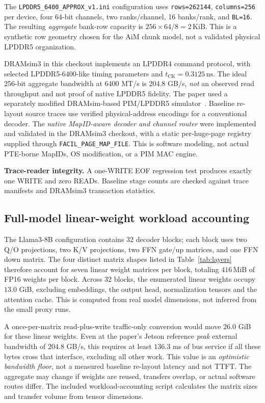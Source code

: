 \documentclass[conference,10pt]{IEEEtran}
\newcommand{\MiB}{\,\mathrm{MiB}}
\newcommand{\KiB}{\,\mathrm{KiB}}
\begin{document}
The \texttt{LPDDR5\_6400\_APPROX\_v1.ini} configuration uses
\texttt{rows=262144}, \texttt{columns=256} per device, four 64-bit
channels, two ranks/channel, 16 banks/rank, and \texttt{BL=16}.
The resulting \emph{aggregate} bank-row capacity is
$256\times64/8=2\KiB$. This is a synthetic row geometry chosen
for the AiM chunk model, not a validated physical LPDDR5 organization.

DRAMsim3 in this checkout implements an LPDDR4 command protocol, with
selected LPDDR5-6400-like timing parameters and
$t_{\mathrm{CK}}=0.3125\,\mathrm{ns}$. The ideal 256-bit aggregate
bandwidth at 6400 MT/s is 204.8 GB/s, \emph{not} an observed read
throughput and not proof of native LPDDR5 fidelity. The paper used a
separately modified DRAMsim-based PIM/LPDDR5 simulator~\cite{facil}.
Baseline re-layout source traces use verified physical-address encodings
for a conventional decoder. The \emph{native MapID-aware decoder and
channel router} were implemented and validated in the DRAMsim3
checkout, with a static per-huge-page registry supplied through
\texttt{FACIL\_PAGE\_MAP\_FILE}. This is software modeling, not
actual PTE-borne MapIDs, OS modification, or a PIM MAC engine.

\textbf{Trace-reader integrity.} A one-WRITE EOF regression test
produces exactly one WRITE and zero READs. Baseline stage counts are
checked against trace manifests and DRAMsim3 transaction statistics.

\subsection{Full-model linear-weight workload accounting}
The Llama3-8B configuration contains 32 decoder blocks; each block
uses two Q/O projections, two K/V projections, two FFN gate/up
matrices, and one FFN down matrix. The four distinct matrix shapes
listed in Table~\ref{tab:layers} therefore account for seven
linear weight matrices per block, totaling $416\MiB$ of FP16
weights per block. Across 32 blocks, the enumerated linear weights
occupy $13.0$ GiB, excluding embeddings, the output head,
normalization tensors and the attention cache. This is computed
from real model dimensions, not inferred from the small proxy runs.

A once-per-matrix read-plus-write traffic-only conversion would move
$26.0$ GiB for these linear weights. Even at the paper's Jetson
reference \emph{peak} external bandwidth of $204.8$ GB/s, this
requires at least $136.3$ ms of bus service if all these bytes
cross that interface, excluding all other work. This value is an
\emph{optimistic bandwidth floor}, not a measured baseline
re-layout latency and not TTFT. The aggregate may change if
weights are reused, transfers overlap, or actual software routes
differ. The included workload-accounting script calculates the matrix sizes
and transfer volume from tensor dimensions.
\end{document}
